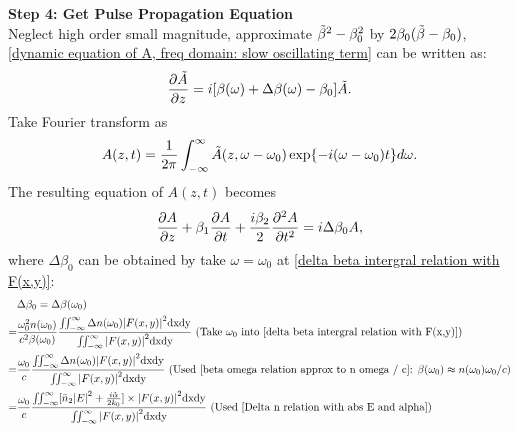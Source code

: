 \documentclass[12pt]{extarticle}
\numberwithin{equation}{section}
\numberwithin{figure}{section}
\numberwithin{table}{section}
\newcommand{\<}{\langle}
\renewcommand{\>}{\rangle}
\theoremstyle{definition}
\newcommand{\SubItem}[1]{
    {\setlength\itemindent{15pt} \item[-] #1}
}
\begin{document}
\begin{itemize}
            \SubItem{\textbf{Step 4: Get Pulse Propagation Equation}\\
            Neglect high order small magnitude, approximate $\Tilde{\beta}^2-\beta_0^2$ by $2\beta_0(\Tilde{\beta}-\beta_0)$, \autoref{dynamic equation of A, freq domain: slow oscillating term} can be written as:
            \begin{equation}
                \pdv{\Tilde{A}}{z}=i[\beta(\omega)+\Delta \beta(\omega)-\beta_0]\Tilde{A}.
            \end{equation}
            Take Fourier transform as
            \begin{equation}
                A(z,t)=\frac{1}{2\pi}\int_{-\infty}^\infty\Tilde{A}(z,\omega-\omega_0)\exp{-i(\omega-\omega_0)t}d\omega.
                \label{Fourier transform from tilde A to A}
            \end{equation}
            The resulting equation of $A(z,t)$ becomes
            \begin{equation}
                \pdv{A}{z}+\beta_1\pdv{A}{t}+\frac{i\beta_2}{2}\pdv[2]{A}{t}=i\Delta \beta_0 A,
                \label{dynamic equation of A, time domain, alpha not explicit yet: slow oscillating term}
            \end{equation}
            where $\Delta \beta_0$ can be obtained by take $\omega=\omega_0$ at \autoref{delta beta intergral relation with F(x,y)}:
                \begin{equation}
                \allowdisplaybreaks
                \begin{split}
                    &\Delta \beta_0 = \Delta \beta(\omega_0)\\
                    =& \frac{\omega_0^2 n(\omega_0)}{c^2 \beta(\omega_0)} \frac{\iint_{-\infty}^\infty \Delta n(\omega_0) \abs{F(x,y)}^2 \mathrm{dxdy}}{\iint_{-\infty}^\infty \abs{F(x,y)}^2 \mathrm{dxdy}} \mbox{ (Take $\omega_0$ into \autoref{delta beta intergral relation with F(x,y)})}\\
                    =&\frac{\omega_0}{c} \frac{\iint_{-\infty}^\infty \Delta n(\omega_0) \abs{F(x,y)}^2 \mathrm{dxdy}}{\iint_{-\infty}^\infty \abs{F(x,y)}^2 \mathrm{dxdy}} \mbox{ (Used \autoref{beta omega relation approx to n omega / c}: $\beta(\omega_0)\approx n(\omega_0)\omega_0/c$)}\\
                    =&\frac{\omega_0}{c} \frac{\iint_{-\infty}^\infty [\Bar{n}_2\abs{E}^2+\frac{i\Tilde{\alpha}}{2k_0}] \times \abs{F(x,y)}^2 \mathrm{dxdy}}{\iint_{-\infty}^\infty \abs{F(x,y)}^2 \mathrm{dxdy}} \mbox{ (Used \autoref{Delta n relation with abs E and alpha})}\\

\end{split}
\end{equation}}
\end{itemize}
\end{document}
